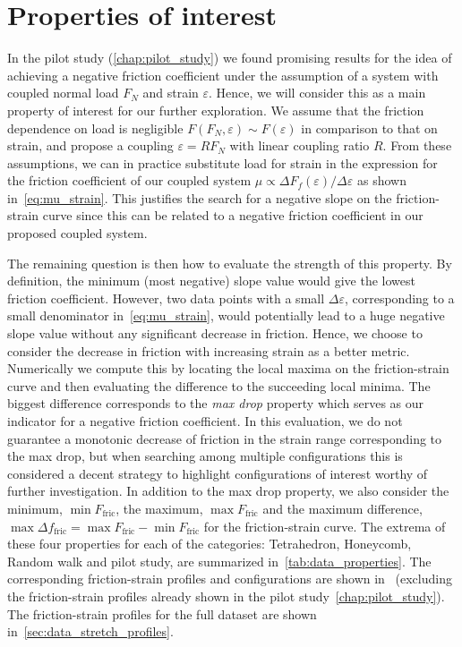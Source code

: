 \section{Properties of interest} 
In the pilot study (\cref{chap:pilot_study}) we found promising results for the idea of achieving a negative friction coefficient under the assumption of a system with coupled normal load $F_N$ and strain $\varepsilon$. Hence, we will consider this as a main property of interest for our further exploration. We assume that the friction dependence on load is negligible $F(F_N, \varepsilon) \sim F(\varepsilon)$ in comparison to that on strain, and propose a coupling $\varepsilon = R F_N$ with linear coupling ratio $R$. From these assumptions, we can in practice substitute load for strain in the expression for the friction coefficient of our coupled system $\mu \propto \Delta F_f(\varepsilon) / \Delta \varepsilon$ as shown in~\cref{eq:mu_strain}. This justifies the search for a negative slope on the friction-strain curve since this can be related to a negative friction coefficient in our proposed coupled system. 

The remaining question is then how to evaluate the strength of this property. By
definition, the minimum (most negative) slope value would give the lowest
friction coefficient. However, two data points with a small $\Delta
\varepsilon$, corresponding to a small denominator in~\cref{eq:mu_strain}, would
potentially lead to a huge negative slope value without any significant decrease
in friction. Hence, we choose to consider the decrease in friction with
increasing strain as a better metric. Numerically we compute this by locating
the local maxima on the friction-strain curve and then evaluating the difference
to the succeeding local minima. The biggest difference corresponds to the
\textit{max drop} property which serves as our indicator for a negative friction
coefficient. In this evaluation, we do not guarantee a monotonic decrease of
friction in the strain range corresponding to the max drop, but when searching
among multiple configurations this is considered a decent strategy to highlight
configurations of interest worthy of further investigation. In addition to the
max drop property, we also consider the minimum, $\min F_{\text{fric}}$, the
maximum, $\max F_{\text{fric}}$ and the maximum difference, $\max \Delta
f_{\text{fric}} = \max F_{\text{fric}} - \min F_{\text{fric}}$ for the
friction-strain curve. The extrema of these four properties for each of the
categories: Tetrahedron, Honeycomb, Random walk and pilot study, are summarized
in~\cref{tab:data_properties}. The corresponding friction-strain profiles and
configurations are shown in~ (excluding
the friction-strain profiles already shown in the pilot
study~\cref{chap:pilot_study}). The friction-strain profiles for the full
dataset are shown in~\cref{sec:data_stretch_profiles}. 


